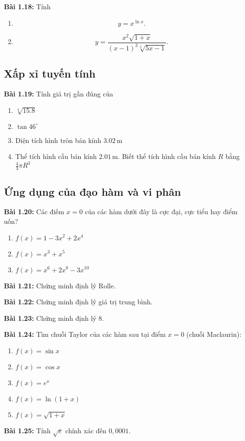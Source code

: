 \textbf{Bài 1.18:} Tính 
\begin{enumerate}[label=(\alph*)]
  \item \[y=x^{\ln x}.\]  
  \item \[y=\frac{x^2 \sqrt{1+x}}{(x-1)^3 \sqrt[5]{5x-1}}.\]
\end{enumerate}

\subsection*{Xấp xỉ tuyến tính}
\textbf{Bài 1.19:} Tính giá trị gần đúng của 
\begin{enumerate}[label=(\alph*)]
    \item $\sqrt[4]{15.8}$
    \item $\tan 46^\circ$
    \item Diện tích hình tròn bán kính $3.02\,\mathrm{m}$
    \item Thể tích hình cầu bán kính $2.01\,\mathrm{m}$. Biết thể tích hình cầu bán kính $R$ bằng $\frac{4}{3}\pi R^3$
\end{enumerate}
\vspace{5pt}



\subsection*{Ứng dụng của đạo hàm và vi phân}
\textbf{Bài 1.20:} Các điếm \(x=0\) của các hàm dưới đây là cực đại, cực tiểu hay điểm uốn?
\begin{enumerate}[label=(\alph*)]
    \item \(f(x)=1-3x^2+2x^4\)
    \item \(f(x)=x^3+x^5\)
    \item \(f(x)=x^6+2x^8-3x^{10}\)
\end{enumerate}
\vspace{5pt}

\textbf{Bài 1.21:} Chứng minh định lý Rolle.
\vspace{5pt}

\textbf{Bài 1.22:} Chứng minh định lý giá trị trung bình.
\vspace{5pt}

\textbf{Bài 1.23:} Chứng minh định lý 8.

\textbf{Bài 1.24:} Tìm chuỗi Taylor của các hàm sau tại điểm \(x=0\) (chuỗi Maclaurin):
\begin{enumerate}[label=(\alph*)]
    \item \(f(x)=\sin x\)
    \item \(f(x)=\cos x\)
    \item \(f(x)=e^x\)
    \item \(f(x)=\ln(1+x)\)
    \item \(f(x)=\sqrt{1+x}\)
\end{enumerate}
\vspace{5pt}

\textbf{Bài 1.25:} Tính \(\sqrt{e}\) chính xác đến \(0,0001\). 